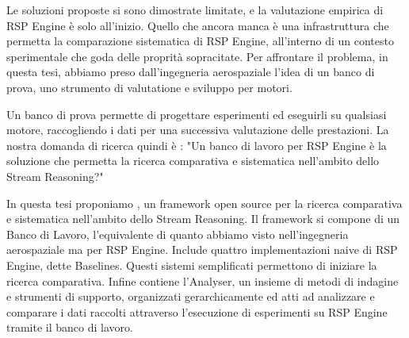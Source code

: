 Le soluzioni proposte si sono dimostrate limitate, e la valutazione empirica di RSP Engine \`e  solo all'inizio. Quello che ancora manca \`e  una infrastruttura che permetta la comparazione sistematica di RSP Engine, all'interno di un contesto sperimentale che goda delle proprit\`a sopracitate. Per affrontare il problema, in questa tesi, abbiamo preso dall'ingegneria aerospaziale l'idea di un banco di prova, uno strumento di valutatione e sviluppo per motori.

Un banco di prova permette di progettare esperimenti ed eseguirli su qualsiasi motore, raccogliendo i dati per una successiva valutazione delle prestazioni. %
La nostra domanda di ricerca quindi \`e : "Un banco di lavoro per RSP Engine \`e  la soluzione che permetta la ricerca comparativa e sistematica nell'ambito dello Stream Reasoning?"

In questa tesi proponiamo \namens, un framework open source per la ricerca comparativa e sistematica nell'ambito dello Stream Reasoning. Il framework si compone di un Banco di Lavoro, l'equivalente di quanto abbiamo visto nell'ingegneria aerospaziale ma per RSP Engine. Include quattro implementazioni naive di RSP Engine, dette Baselines. Questi sistemi semplificati permettono di iniziare la ricerca comparativa. Infine \name contiene l'Analyser, un insieme di metodi di indagine e strumenti di supporto, organizzati gerarchicamente ed atti ad analizzare e comparare i dati raccolti attraverso l'esecuzione di esperimenti su RSP Engine tramite il banco di lavoro.
